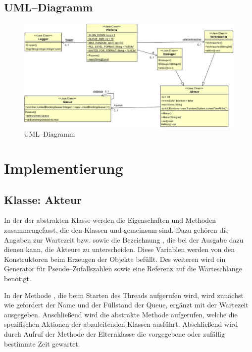 \subsection{UML–Diagramm} %
\label{sub:uml_diagramm}
\begin{figure}[H]
\begin{center}
\includegraphics[width=\textwidth]{UML.jpg}
\caption{UML–Diagramm}
\label{fig:epk}
\end{center}
\end{figure}


\newpage
\section{Implementierung} %
\label{sec:implementierung}

\subsection{Klasse: Akteur} %
\label{sub:klasse_akteur}
In der der abstrakten Klasse  werden die Eigenschaften und Methoden zusammengefasst, die den Klassen  und  gemeinsam sind. Dazu gehören die Angaben zur Wartezeit  bzw.  sowie die Bezeichnung , die bei der Ausgabe dazu dienen kann, die Akteure zu unterscheiden. Diese Variablen werden von den Konstruktoren beim Erzeugen der Objekte befüllt. Des weiteren wird ein Generator für Pseude–Zufallszahlen sowie eine Referenz auf die Warteschlange benötigt.

In der Methode , die beim Starten des Threads aufgerufen wird, wird zunächst wie gefordert der Name und der Füllstand der Queue, ergänzt mit der Wartezeit ausgegeben. Anschließend wird die abstrakte Methode  aufgerufen, welche die spezifischen Aktionen der abzuleitenden Klassen ausführt. Abschließend wird durch Aufruf der Methode  der Elternklasse  die vorgegebene oder zufällig bestimmte Zeit gewartet.

